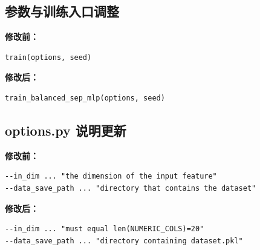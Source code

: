 ﻿\documentclass{ctexart}
\begin{document}
\subsection{参数与训练入口调整}
\textbf{修改前：}
\begin{lstlisting}
train(options, seed)
\end{lstlisting}

\textbf{修改后：}
\begin{lstlisting}
train_balanced_sep_mlp(options, seed)
\end{lstlisting}

\subsection{options.py 说明更新}
\textbf{修改前：}
\begin{lstlisting}
--in_dim ... "the dimension of the input feature"
--data_save_path ... "directory that contains the dataset"
\end{lstlisting}

\textbf{修改后：}
\begin{lstlisting}
--in_dim ... "must equal len(NUMERIC_COLS)=20"
--data_save_path ... "directory containing dataset.pkl"
\end{lstlisting}
\end{document}
